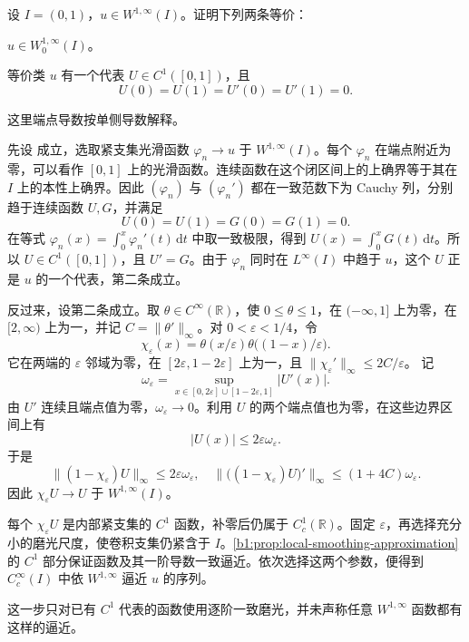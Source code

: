 \begin{optionalexercise}\label{b1:ex:22-w0-infty-interval}
设 \(I=(0,1)\)，\(u\in W^{1,\infty}(I)\)。证明下列两条等价：
\begin{equivalences}
\item\label{b1:item:22-w0-infty-closure}
\(u\in W_0^{1,\infty}(I)\)。
\item\label{b1:item:22-w0-infty-c1-endpoints}
等价类 \(u\) 有一个代表 \(U\in C^1([0,1])\)，且
\[
 U(0)=U(1)=U'(0)=U'(1)=0.
\]
\end{equivalences}
这里端点导数按单侧导数解释。
\end{optionalexercise}
\begin{solution}
先设 成立，选取紧支集光滑函数 \(\varphi_n\to u\) 于 \(W^{1,\infty}(I)\)。每个 \(\varphi_n\) 在端点附近为零，可以看作 \([0,1]\) 上的光滑函数。连续函数在这个闭区间上的上确界等于其在 \(I\) 上的本性上确界。因此 \((\varphi_n)\) 与 \((\varphi_n')\) 都在一致范数下为 Cauchy 列，分别趋于连续函数 \(U,G\)，并满足
\[
 U(0)=U(1)=G(0)=G(1)=0.
\]
在等式 \(\varphi_n(x)=\int_0^x\varphi_n'(t)\,\mathrm dt\) 中取一致极限，得到 \(U(x)=\int_0^xG(t)\,\mathrm dt\)。所以 \(U\in C^1([0,1])\)，且 \(U'=G\)。由于 \(\varphi_n\) 同时在 \(L^\infty(I)\) 中趋于 \(u\)，这个 \(U\) 正是 \(u\) 的一个代表，第二条成立。

反过来，设第二条成立。取 \(\theta\in C^\infty(\mathbb R)\)，使 \(0\le\theta\le1\)，在 \((-\infty,1]\) 上为零，在 \([2,\infty)\) 上为一，并记 \(C=\|\theta'\|_\infty\)。对 \(0<\varepsilon<1/4\)，令
\[
 \chi_\varepsilon(x)=\theta(x/\varepsilon)
                 \theta\bigl((1-x)/\varepsilon\bigr).
\]
它在两端的 \(\varepsilon\) 邻域为零，在 \([2\varepsilon,1-2\varepsilon]\) 上为一，且
\(\|\chi_\varepsilon'\|_\infty\le2C/\varepsilon\)。
记
\[
 \omega_\varepsilon
 =\sup_{x\in[0,2\varepsilon]\cup[1-2\varepsilon,1]}|U'(x)|.
\]
由 \(U'\) 连续且端点值为零，\(\omega_\varepsilon\to0\)。利用 \(U\) 的两个端点值也为零，在这些边界区间上有
\[
 |U(x)|\le2\varepsilon\omega_\varepsilon.
\]
于是
\[
 \|(1-\chi_\varepsilon)U\|_\infty
 \le2\varepsilon\omega_\varepsilon,
 \quad
 \|\bigl((1-\chi_\varepsilon)U\bigr)'\|_\infty
 \le(1+4C)\omega_\varepsilon.
\]
因此 \(\chi_\varepsilon U\to U\) 于 \(W^{1,\infty}(I)\)。

每个 \(\chi_\varepsilon U\) 是内部紧支集的 \(C^1\) 函数，补零后仍属于 \(C_c^1(\mathbb R)\)。固定 \(\varepsilon\)，再选择充分小的磨光尺度，使卷积支集仍紧含于 \(I\)。\cref{b1:prop:local-smoothing-approximation}的 \(C^1\) 部分保证函数及其一阶导数一致逼近。依次选择这两个参数，便得到 \(C_c^\infty(I)\) 中依 \(W^{1,\infty}\) 逼近 \(u\) 的序列。

这一步只对已有 \(C^1\) 代表的函数使用逐阶一致磨光，并未声称任意 \(W^{1,\infty}\) 函数都有这样的逼近。
\end{solution}


